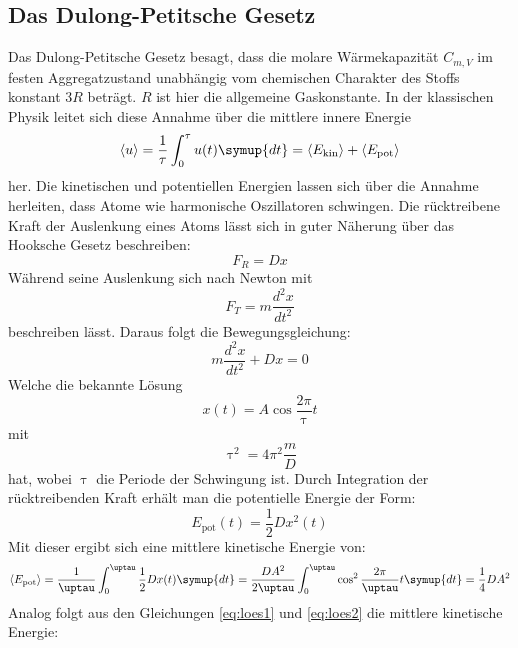 \subsection{Das Dulong-Petitsche Gesetz}
Das Dulong-Petitsche Gesetz besagt, dass die molare Wärmekapazität $C_{m,V}$ im festen Aggregatzustand
unabhängig vom chemischen Charakter des Stoffs konstant $3R$ beträgt.
$R$ ist hier die allgemeine Gaskonstante.
In der klassischen Physik leitet sich diese Annahme über die mittlere innere Energie
 \begin{equation}
 \langle u \rangle = \frac{1}{\tau} \int_0^\tau u(t)\symup{dt} = \langle E_\text{kin} \rangle + \langle
E_\text{pot} \rangle
 \end{equation}
her.
Die kinetischen und potentiellen Energien lassen sich über die Annahme herleiten, dass Atome
wie harmonische Oszillatoren schwingen.
Die rücktreibene Kraft der Auslenkung eines Atoms lässt sich in guter Näherung über das Hooksche Gesetz beschreiben:
\begin{equation}
  F_R= Dx
\end{equation}
Während seine Auslenkung sich nach Newton mit
\begin{equation}
  F_T=   m \frac{d^2 x}{dt^2}
\end{equation}
beschreiben lässt.
Daraus folgt die Bewegungsgleichung:
\begin{equation}
  m \frac{d^2 x}{dt^2}+Dx=0 
\end{equation}
Welche die bekannte Lösung
\begin{equation}
  \label{eq:loes1}
  x(t)=A \cos{\frac{2\pi}{\uptau}t}
\end{equation}
mit
\begin{equation}
  \label{eq:loes2}
  \uptau^2 = 4 \pi^2 \frac{m}{D}
\end{equation}
hat, wobei $\uptau$ die Periode der Schwingung ist.
Durch Integration der rücktreibenden Kraft erhält man die potentielle Energie der Form:
\begin{equation}
  E_\text{pot}(t) = \frac{1}{2}Dx^2(t)
\end{equation}
Mit dieser ergibt sich eine mittlere kinetische Energie von:
\begin{equation}
  \langle E_\text{pot} \rangle = \frac{1}{\uptau} \int_0^\uptau \frac{1}{2}Dx(t)\symup{dt}=\frac{DA^2}{2\uptau}\int_0^\uptau \cos^2{\frac{2\pi}{\uptau}t}\symup{dt} =\frac{1}{4}DA^2
\end{equation}
Analog folgt aus den Gleichungen \eqref{eq:loes1} und \eqref{eq:loes2} die mittlere kinetische Energie:
